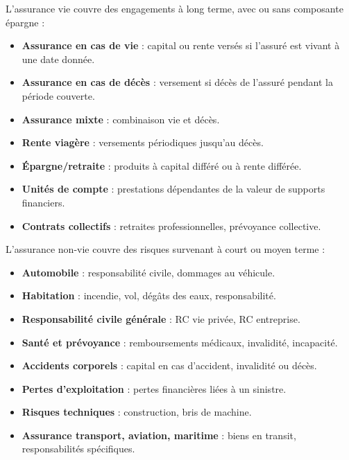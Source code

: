 \begin{f}
	
	L’assurance vie couvre des engagements à long terme, avec ou sans composante épargne :
	\begin{itemize}[nosep]
		\item \textbf{Assurance en cas de vie} : capital ou rente versés si l’assuré est vivant à une date donnée.
		\item \textbf{Assurance en cas de décès} : versement si décès de l’assuré pendant la période couverte.
		\item \textbf{Assurance mixte} : combinaison vie et décès.
		\item \textbf{Rente viagère} : versements périodiques jusqu’au décès.
		\item \textbf{Épargne/retraite} : produits à capital différé ou à rente différée.
		\item \textbf{Unités de compte} : prestations dépendantes de la valeur de supports financiers.
		\item \textbf{Contrats collectifs} : retraites professionnelles, prévoyance collective.
	\end{itemize}
	
	
	L’assurance non-vie couvre des risques survenant à court ou moyen terme :
	\begin{itemize}[nosep]
		\item \textbf{Automobile} : responsabilité civile, dommages au véhicule.
		\item \textbf{Habitation} : incendie, vol, dégâts des eaux, responsabilité.
		\item \textbf{Responsabilité civile générale} : RC vie privée, RC entreprise.
		\item \textbf{Santé et prévoyance} : remboursements médicaux, invalidité, incapacité.
		\item \textbf{Accidents corporels} : capital en cas d’accident, invalidité ou décès.
		\item \textbf{Pertes d’exploitation} : pertes financières liées à un sinistre.
		\item \textbf{Risques techniques} : construction, bris de machine.
		\item \textbf{Assurance transport, aviation, maritime} : biens en transit, responsabilités spécifiques.
	\end{itemize}
	

\end{f}
